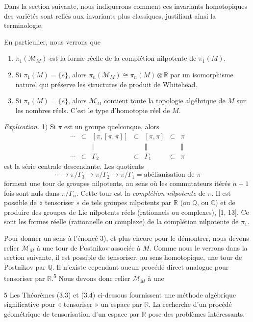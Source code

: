 \documentclass[
  french,
  a3paper,
  a3paper]{extarticle}
\begin{document}
Dans la section suivante, nous indiquerons comment ces invariants
homotopiques des variétés sont reliés aux invariants plus classiques,
justifiant ainsi la terminologie.

En particulier, nous verrons que

\begin{enumerate}
\def\labelenumi{\arabic{enumi})}
\item
  \(\pi_1(\mathcal M_M)\) est la forme réelle de la complétion
  nilpotente de \(\pi_1(M)\).
\item
  Si \(\pi_1(M)=\{e\}\), alors
  \(\pi_n(\mathcal M_M)\cong\pi_n(M)\otimes\mathbb R\) par un
  isomorphisme naturel qui préserve les structures de produit de
  Whitehead.
\item
  Si \(\pi_1(M)=\{e\}\), alors \(\mathcal M_M\) contient toute la
  topologie algébrique de \(M\) sur les nombres réels. C'est le type
  d'homotopie réel de \(M\).
\end{enumerate}

\emph{Explication.} 1) Si \(\pi\) est un groupe quelconque, alors \[
\begin{array}{ccccccc}
\cdots&\subset&[\pi,[\pi,\pi]]&\subset&[\pi,\pi]&\subset&\pi\\
&&\Vert&&\Vert&&\Vert\\
\cdots&\subset&\Gamma_2&\subset&\Gamma_1&\subset&\pi
\end{array}
\] est la série centrale descendante. Les quotients \[
\cdots\to\pi/\Gamma_3\to\pi/\Gamma_2\to\pi/\Gamma_1=\text{abélianisation de }\pi
\] forment une tour de groupes nilpotents, au sens où les commutateurs
itérés \(n+1\) fois sont nuls dans \(\pi/\Gamma_n\). Cette tour est la
\emph{complétion nilpotente} de \(\pi\). Il est possible de « tensoriser
» de tels groupes nilpotents par \(\mathbb R\) (ou \(\mathbb Q\), ou
\(\mathbb C\)) et de produire des groupes de Lie nilpotents réels
(rationnels ou complexes), {[}1, 13{]}. Ce sont les formes réelle
(rationnelle ou complexe) de la complétion nilpotente de \(\pi_1\).

Pour donner un sens à l'énoncé 3), et plus encore pour le démontrer,
nous devons relier \(\mathcal M_M\) à une tour de Postnikov associée à
\(M\). Comme nous le verrons dans la section suivante, il est possible
de tensoriser, au sens homotopique, une tour de Postnikov par
\(\mathbb Q\). Il n'existe cependant aucun procédé direct analogue pour
tensoriser par \(\mathbb R\).\textsuperscript{5} Nous devons donc relier
\(\mathcal M_M\) à une

5 Les Théorèmes (3.3) et (3.4) ci-dessous fournissent une méthode
algébrique significative pour « tensoriser » un espace par
\(\mathbb R\). La recherche d'un procédé géométrique de tensorisation
d'un espace par \(\mathbb R\) pose des problèmes intéressants.
\end{document}

